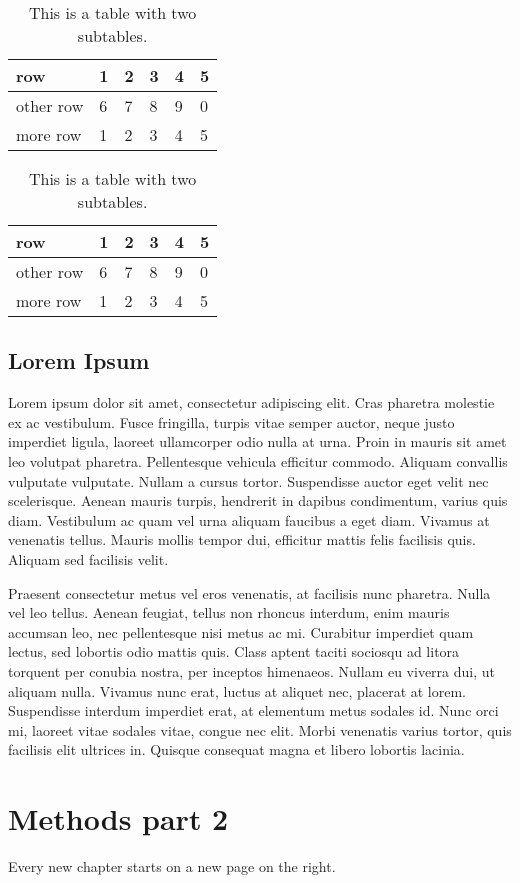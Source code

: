 \begin{table}

\begin{subtable}{1\textwidth}
    \centering
    \begin{tabular}{l|lllll}
        row & 1 & 2 & 3 & 4 & 5 \\ \hline
        other row & 6 & 7 & 8 & 9 & 0 \\ \hline
        more row & 1 & 2 & 3 & 4 & 5 \\
    \end{tabular}
\end{subtable}

\bigskip

\begin{subtable}{1\textwidth}
    \centering
    \begin{tabular}{l|lllll}
        row & 1 & 2 & 3 & 4 & 5 \\ \hline
        other row & 6 & 7 & 8 & 9 & 0 \\ \hline
        more row & 1 & 2 & 3 & 4 & 5 \\
    \end{tabular}
\end{subtable}

\caption{This is a table with two subtables.} \label{tab:example}

\end{table}

\section{Lorem Ipsum}
Lorem ipsum dolor sit amet, consectetur adipiscing elit. Cras pharetra molestie ex ac vestibulum. Fusce fringilla, turpis vitae semper auctor, neque justo imperdiet ligula, laoreet ullamcorper odio nulla at urna. Proin in mauris sit amet leo volutpat pharetra. Pellentesque vehicula efficitur commodo. Aliquam convallis vulputate vulputate. Nullam a cursus tortor. Suspendisse auctor eget velit nec scelerisque. Aenean mauris turpis, hendrerit in dapibus condimentum, varius quis diam. Vestibulum ac quam vel urna aliquam faucibus a eget diam. Vivamus at venenatis tellus. Mauris mollis tempor dui, efficitur mattis felis facilisis quis. Aliquam sed facilisis velit.

Praesent consectetur metus vel eros venenatis, at facilisis nunc pharetra. Nulla vel leo tellus. Aenean feugiat, tellus non rhoncus interdum, enim mauris accumsan leo, nec pellentesque nisi metus ac mi. Curabitur imperdiet quam lectus, sed lobortis odio mattis quis. Class aptent taciti sociosqu ad litora torquent per conubia nostra, per inceptos himenaeos. Nullam eu viverra dui, ut aliquam nulla. Vivamus nunc erat, luctus at aliquet nec, placerat at lorem. Suspendisse interdum imperdiet erat, at elementum metus sodales id. Nunc orci mi, laoreet vitae sodales vitae, congue nec elit. Morbi venenatis varius tortor, quis facilisis elit ultrices in. Quisque consequat magna et libero lobortis lacinia.

\chapter{Methods part 2}
Every new chapter starts on a new page on the right.